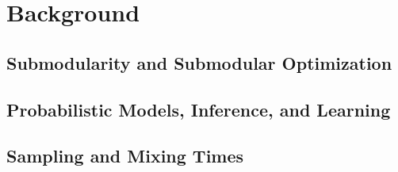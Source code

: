 \chapter{Background} \label{ch:background}

\section{Submodularity and Submodular Optimization}

\section{Probabilistic Models, Inference, and Learning}


\section{Sampling and Mixing Times}